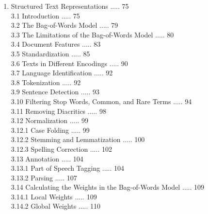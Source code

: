 \documentclass[10pt]{book}
\begin{document}
\begin{enumerate}
2.10 Matrices and Arrays ..... 43\\
2.11 Lists ..... 47\\
2.12 Factors ..... 49\\
2.13 Data Frames ..... 51\\
2.14 Functions Useful in Machine Learning ..... 55\\
2.15 Flow Control Structures ..... 61\\
2.15.1 Conditional Statement ..... 61\\
2.15.2 Loops ..... 64\\
2.16 Packages ..... 65\\
2.16.1 Installing Packages ..... 66\\
2.16.2 Loading Packages ..... 67\\
2.17 Graphics ..... 67
  \item Structured Text Representations ..... 75\\
3.1 Introduction ..... 75\\
3.2 The Bag-of-Words Model ..... 79\\
3.3 The Limitations of the Bag-of-Words Model ..... 80\\
3.4 Document Features ..... 83\\
3.5 Standardization ..... 85\\
3.6 Texts in Different Encodings ..... 90\\
3.7 Language Identification ..... 92\\
3.8 Tokenization ..... 92\\
3.9 Sentence Detection ..... 93\\
3.10 Filtering Stop Words, Common, and Rare Terms ..... 94\\
3.11 Removing Diacritics ..... 98\\
3.12 Normalization ..... 99\\
3.12.1 Case Folding ..... 99\\
3.12.2 Stemming and Lemmatization ..... 100\\
3.12.3 Spelling Correction ..... 102\\
3.13 Annotation ..... 104\\
3.13.1 Part of Speech Tagging ..... 104\\
3.13.2 Parsing ..... 107\\
3.14 Calculating the Weights in the Bag-of-Words Model ..... 109\\
3.14.1 Local Weights ..... 109\\
3.14.2 Global Weights ..... 110\\

\end{enumerate}
\end{document}
